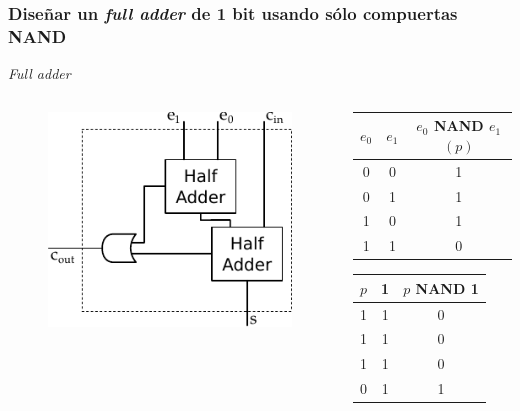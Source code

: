 \documentclass[mathserif,hyperref]{beamer}
\begin{document}
\begin{frame}[t]
\frametitle{\small Diseñar un \textit{full adder} de 1 bit usando sólo
compuertas NAND}
\textit{Full adder}
\begin{columns}[T]
  \begin{figure}[htp]
    \includegraphics[scale=0.6]{fulladder.pdf}
  \end{figure}

  \begin{center}
  \begin{tabular}{| c | c || c |}
    \hline
    $e_0$ & $e_1$ & $e_0$ NAND $e_1$ $(p)$ \\ \hline
      0   &   0   &            1           \\
      0   &   1   &            1           \\
      1   &   0   &            1           \\
      1   &   1   &            0           \\
    \hline
  \end{tabular}
  \pause
  \begin{tabular}{| c | c || c |}
    \hline
    $p$ & 1 & $p$ NAND 1 \\ \hline
     1  & 1 &      0     \\
     1  & 1 &      0     \\
     1  & 1 &      0     \\
     0  & 1 &      1     \\
    \hline
  \end{tabular}
  \end{center}
\end{columns}
\end{frame}
\end{document}
